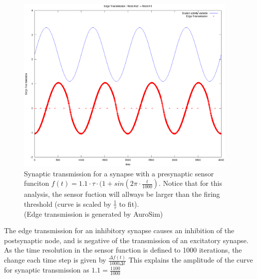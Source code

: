 \begin{figure}[hb!tp]
	\centering
	\includegraphics[width=0.95\textwidth]{./synapticTransmissionPlots/eps_transmissionKappaAboveThreshold.eps} 	
	\caption{Synaptic transmission for a synapse with a presynaptic sensor funciton \mbox{$f(t) = 1.1 \cdot \tau \cdot (1 + sin( 2\pi \cdot \frac{t}{1000})$}. 
			Notice that for this analysis, the sensor fuction will allways be larger than the firing threshold (curve is scaled by $\frac{1}{\tau}$ to fit). \\
			(Edge transmission is generated by AuroSim)} 
	\label{figEdgeTransmissionKaboveT}
\end{figure}

			The edge transmission for an inhibitory synapse causes an inhibition of the postsynaptic node, and is negative of the transmission of an excitatory synapse.
			As the time resolution in the sensor function is defined to 1000 iterations, the change each time step is given by $\frac{\Delta f(t)}{1000 \Delta t}$
			This explains the amplitude of the curve for synaptic transmission as $1.1 = \frac{1100}{1000}$

